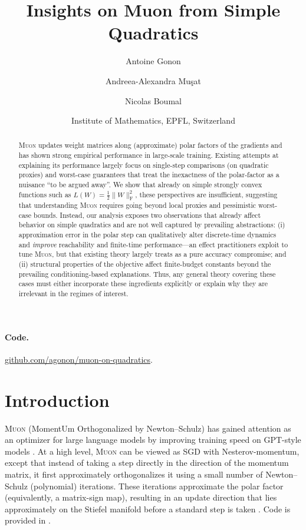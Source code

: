 \documentclass{article}
\title{
Insights on Muon from Simple Quadratics
}
\author{
Antoine Gonon
\and
Andreea-Alexandra Muşat
\and
Nicolas Boumal
\and
\small Institute of Mathematics, EPFL, Switzerland
}
\date{} %
\theoremstyle{plain}
\theoremstyle{definition}
\theoremstyle{remark}
\newcommand{\loss}{L}
\newcommand{\Muon}{\textsc{Muon}}
\begin{document}
\maketitle
\begin{abstract}
\Muon{} updates weight matrices along (approximate) polar factors of the gradients and has shown strong empirical performance in large-scale training.
Existing attempts at explaining its performance largely focus on single-step comparisons (on quadratic proxies) and worst-case guarantees that treat the inexactness of the polar-factor as a nuisance ``to be argued away''. 
We show that already on simple strongly convex functions such as $\loss(W)=\tfrac12\|W\|_{\mathrm{F}}^2$, these perspectives are insufficient, suggesting that understanding \Muon{} requires going beyond local proxies and pessimistic worst-case bounds. 
Instead, our analysis exposes two observations that already affect behavior on simple quadratics and are not well captured by prevailing abstractions:
(i) approximation error in the polar step can qualitatively alter discrete-time dynamics and \emph{improve} reachability and finite-time performance---an effect practitioners exploit to tune \Muon{}, but that existing theory largely treats as a pure accuracy compromise; and
(ii) structural properties of the objective affect finite-budget constants beyond the prevailing conditioning-based explanations. 
Thus, any general theory covering these cases must either incorporate these ingredients explicitly or explain why they are irrelevant in the regimes of interest.
\end{abstract}


\paragraph{Code.} \href{https://github.com/agonon/muon-on-quadratics}{github.com/agonon/muon-on-quadratics}.


\section{Introduction}

\Muon{} (MomentUm Orthogonalized by Newton--Schulz)
has gained attention 
as an optimizer for large language models 
by improving training speed 
on GPT-style models 
\cite{jordan2024muon,liu2025muonscalablellmtraining,shah2025practicalefficiencymuon}. 
At a high level,
\Muon{} can be viewed as SGD with Nesterov-momentum, 
except that instead of taking 
a step directly in the direction of the momentum matrix,
it first approximately orthogonalizes it 
using a small number of
Newton--Schulz (polynomial) iterations. 
These iterations approximate the polar factor 
(equivalently, a matrix-sign map),
resulting in an update direction that 
lies approximately on the Stiefel manifold
before a standard step is taken
\cite{jordan2024muon}. Code is provided in .
\end{document}
